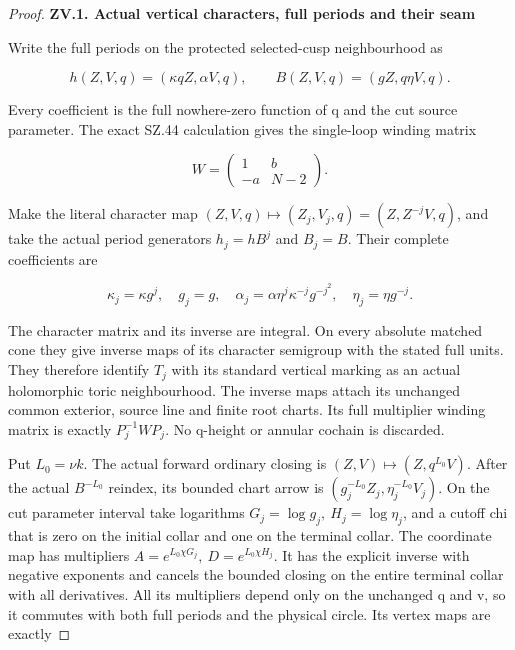 \begin{proof}
\par

\medskip\noindent\textbf{ZV.1. Actual vertical characters, full periods and their seam}

\par\nopagebreak[4]

Write the full periods on the protected selected-cusp neighbourhood as

\[
 h(Z,V,q)=(\kappa qZ,\alpha V,q),\qquad
 B(Z,V,q)=(gZ,q\eta V,q).
\]

Every coefficient is the full nowhere-zero function of q and the cut
source parameter. The exact SZ.44 calculation gives the single-loop
winding matrix

\[
 W=\begin{pmatrix}1&b\\-a&N-2\end{pmatrix}.
\]

Make the literal character map \((Z,V,q)\mapsto(Z_j,V_j,q)=(Z,Z^{-j}V,q)\),
and take the actual period generators \(h_j=hB^j\) and \(B_j=B\). Their
complete coefficients are

\[
 \kappa_j=\kappa g^j,\quad g_j=g,\quad
 \alpha_j=\alpha\eta^j\kappa^{-j}g^{-j^2},\quad
 \eta_j=\eta g^{-j}.                                  \tag{ZV.3}
\]

The character matrix and its inverse are integral. On every absolute
matched cone they give inverse maps of its character semigroup with
the stated full units. They therefore identify \(T_j\) with its standard
vertical marking as an actual holomorphic toric neighbourhood. The
inverse maps attach its unchanged common exterior, source line and
finite root charts. Its full multiplier winding matrix is exactly
\(P_j^{-1}WP_j\). No q-height or annular cochain is discarded.

Put \(L_0=\nu k\). The actual forward ordinary closing is \((Z,V)\mapsto(Z,q^{L_0}V)\). After the actual \(B^{-L_0}\) reindex, its bounded chart arrow is
\((g_j^{-L_0}Z_j,\eta_j^{-L_0}V_j)\). On the cut parameter interval take
logarithms \(G_j=\log g_j,\ H_j=\log\eta_j\), and a cutoff chi that is zero
on the initial collar and one on the terminal collar. The coordinate
map has multipliers \(A=e^{L_0\chi G_j},\ D=e^{L_0\chi H_j}\).
It has the explicit inverse with negative exponents and cancels the
bounded closing on the entire terminal collar with all derivatives.
All its multipliers depend only on the unchanged q and v, so it
commutes with both full periods and the physical circle. Its vertex
maps are exactly


\end{proof}
